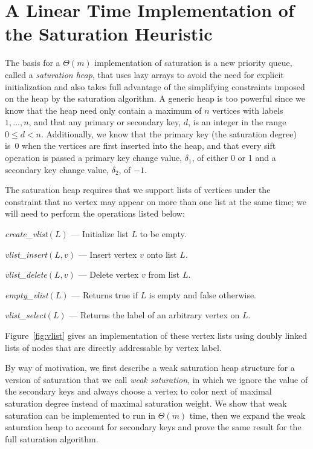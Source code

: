 \section{A Linear Time Implementation of the Saturation Heuristic}
The basis for a $\Theta(m)$ implementation of saturation is a new priority
queue, called a {\em saturation heap}, that
uses lazy arrays to avoid the need for explicit initialization and also 
takes full advantage of the simplifying constraints imposed on the heap 
by the saturation algorithm. A generic heap is too powerful since we know 
that the heap need only contain a maximum of $n$ vertices with 
labels $1, \ldots, n$, and that any
primary or secondary key, $d$, is an integer in the range $0 \leq d < n$.  
Additionally, we know that the primary key (the saturation degree) is~0 when the
vertices are first inserted into the heap, and that every sift operation is 
passed a primary key change value, $\delta_1$, of either 0 or 1 and a 
secondary key change value, $\delta_2$, of $-1$.

The saturation heap requires that we support lists of vertices under the 
constraint that no vertex may appear on more than one list at the same 
time; we will need to perform the operations listed below:
\begin{list}{}
   {\setlength{\labelwidth}{1.75in}
    \setlength{\leftmargin}{1.75in}
    \setlength{\rightmargin}{0in}
    \setlength{\labelsep}{0in}
   }
\item[{\em create\_vlist\/}$(L)$\hfill]
--- Initialize list $L$ to be empty.  
\item[{\em vlist\_insert\/}$(L,v)$\hfill]
--- Insert vertex $v$ onto list $L$.
\item[{\em vlist\_delete\/}$(L,v)$\hfill]
--- Delete vertex $v$ from list $L$.
\item[{\em empty\_vlist\/}$(L)$\hfill]
--- Returns true if $L$ is empty and false otherwise.
\item[{\em vlist\_select\/}$(L)$\hfill]
--- Returns the label of an arbitrary vertex on $L$.
\end{list}
Figure~\ref{fig:vlist} gives an implementation of these vertex lists using 
doubly linked lists of nodes that are directly addressable by vertex label.  

By way of motivation, we first describe a weak saturation heap structure for 
a version of saturation that we call {\em weak saturation}, in which we 
ignore the value of the secondary keys and always choose a vertex to color 
next of maximal saturation degree instead of maximal saturation weight.  We
show that weak saturation can be implemented to run in $\Theta(m)$ time, then 
we expand the weak saturation heap to account for secondary keys and prove 
the same result for the full saturation algorithm.  

